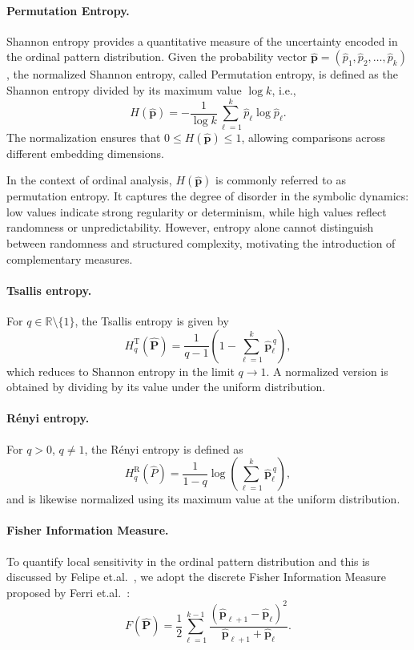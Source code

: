\documentclass[12pt,a4paper]{article}
\begin{document}
\paragraph{Permutation Entropy.}
Shannon entropy provides a quantitative measure of the uncertainty
encoded in the ordinal pattern distribution. Given the probability
vector
\(\widehat{\mathbf{p}} = (\widehat{p}_1,\widehat{p}_{2},\dots,\widehat{p}_k)\),
the normalized Shannon entropy, called Permutation entropy, is defined
as the Shannon entropy divided by its maximum value \(\log k\), i.e., \[
H(\widehat{\mathbf p})
=
-\frac{1}{\log k}
\sum_{\ell=1}^{k}
\widehat p_\ell \log \widehat p_\ell.
\] 
The normalization ensures that \(0\le H(\widehat{\mathbf p})\le1\), allowing comparisons across different embedding dimensions.

In the context of ordinal analysis, \(H(\widehat{\mathbf{p}})\) is commonly referred to as permutation entropy. It captures the degree of disorder in the symbolic dynamics: low values indicate strong regularity or determinism, while high values reflect randomness or
unpredictability. However, entropy alone cannot distinguish between randomness and structured complexity, motivating the introduction of complementary measures.

\paragraph{Tsallis entropy.}
For $q \in \mathbb{R}\setminus\{1\}$, the Tsallis entropy is given by
\[
H^{\mathrm{T}}_{q}(\widehat{\mathbf P})
= \frac{1}{q-1}\left(1 - \sum_{\ell=1}^{k} \widehat{\mathbf p}_\ell^{\,q}\right),
\]
which reduces to Shannon entropy in the limit $q \to 1$.  
A normalized version is obtained by dividing by its value under the uniform distribution.

\paragraph{Rényi entropy.}
For $q>0$, $q\neq 1$, the Rényi entropy is defined as
\[
H^{\mathrm{R}}_{q}(\widehat{P})
= \frac{1}{1-q}\log\!\left(\sum_{\ell=1}^{k} \widehat{\mathbf p}_\ell^{\,q}\right),
\]
and is likewise normalized using its maximum value at the uniform distribution.

\paragraph{Fisher Information Measure.}
To quantify local sensitivity in the ordinal pattern distribution and this is discussed by Felipe et.al.~\cite{Olivares2012b}, we adopt the discrete Fisher Information Measure proposed by Ferri et.al.~\cite{Ferri2009}:
\[
F(\widehat{\mathbf P})
= \frac{1}{2}\sum_{\ell=1}^{k-1}
\frac{(\widehat{\mathbf p}_{\ell+1}-\widehat{\mathbf p}_{\ell})^{2}}
{\widehat{\mathbf p}_{\ell+1}+\widehat{\mathbf p}_{\ell}}.
\]
\end{document}
